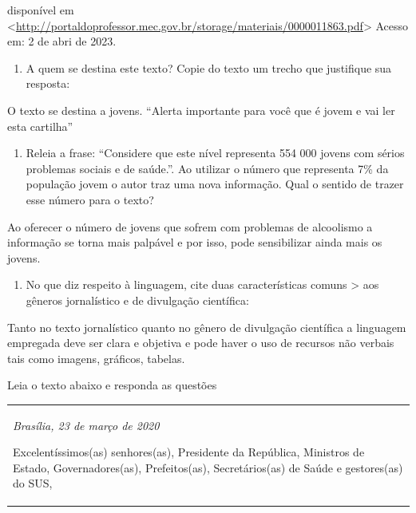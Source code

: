 {disponível em
\textless{}\href{http://portaldoprofessor.mec.gov.br/storage/materiais/0000011863.pdf}{\uline{http://portaldoprofessor.mec.gov.br/storage/materiais/0000011863.pdf}}\textgreater{}
Acesso em: 2 de abri de 2023.

\begin{enumerate}
\def\labelenumi{\alph{enumi})}
\tightlist
\item
  A quem se destina este texto? Copie do texto um trecho que justifique
  sua resposta:
\end{enumerate}

O texto se destina a jovens. ``Alerta importante para você que é jovem e
vai ler esta cartilha''

\begin{enumerate}
\def\labelenumi{\alph{enumi})}
\setcounter{enumi}{1}
\tightlist
\item
  Releia a frase: ``Considere que este nível representa 554 000 jovens
  com sérios problemas sociais e de saúde.''. Ao utilizar o número que
  representa 7\% da população jovem o autor traz uma nova informação.
  Qual o sentido de trazer esse número para o texto?
\end{enumerate}

Ao oferecer o número de jovens que sofrem com problemas de alcoolismo a
informação se torna mais palpável e por isso, pode sensibilizar ainda
mais os jovens.

\begin{enumerate}
\def\labelenumi{\arabic{enumi})}
\setcounter{enumi}{6}
\tightlist
\item
  No que diz respeito à linguagem, cite duas características comuns
  \textgreater{} aos gêneros jornalístico e de divulgação científica:
\end{enumerate}

Tanto no texto jornalístico quanto no gênero de divulgação científica a
linguagem empregada deve ser clara e objetiva e pode haver o uso de
recursos não verbais tais como imagens, gráficos, tabelas.

Leia o texto abaixo e responda as questões

\begin{longtable}[]{@{}
  >{\raggedright\arraybackslash}p{}@{}}
\toprule
\endhead
\emph{Brasília, 23 de março de 2020}

Excelentíssimos(as) senhores(as), Presidente da República, Ministros de
Estado, Governadores(as), Prefeitos(as), Secretários(as) de Saúde e
gestores(as) do SUS,


\end{longtable}}

